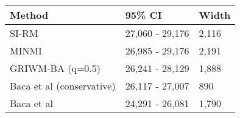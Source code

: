 
\begin{tabular}{lll}
\toprule
Method & 95\% CI & Width\\
\midrule
SI-RM & 27,060 - 29,176 & 2,116\\
MINMI & 26,985 - 29,176 & 2,191\\
GRIWM-BA (q=0.5) & 26,241 - 28,129 & 1,888\\
Baca et al (conservative) & 26,117 - 27,007 & 890\\
Baca et al & 24,291 - 26,081 & 1,790\\
\bottomrule
\end{tabular}
